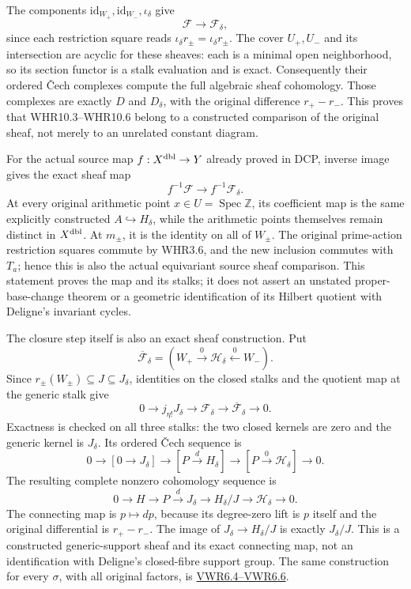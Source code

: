 The components \(\mathrm{id}_{W_+},\mathrm{id}_{W_-},\iota_\delta\) give
\[
\mathcal F\longrightarrow\mathcal F_\delta,
\tag{WHR10.8}
\] since each restriction square reads
\(\iota_\delta r_\pm=\iota_\delta r_\pm\). The cover \(U_+,U_-\) and its
intersection are acyclic for these sheaves: each is a minimal open
neighborhood, so its section functor is a stalk evaluation and is exact.
Consequently their ordered Čech complexes compute the full algebraic
sheaf cohomology. Those complexes are exactly \(D\) and \(D_\delta\),
with the original difference \(r_+-r_-\). This proves that
WHR10.3--WHR10.6 belong to a constructed comparison of the original
sheaf, not merely to an unrelated constant diagram.

For the actual source map \(f:X^{\rm dbl}\to Y\) already proved in DCP,
inverse image gives the exact sheaf map \[
f^{-1}\mathcal F\longrightarrow f^{-1}\mathcal F_\delta.
\tag{WHR10.9}
\] At every original arithmetic point
\(x\in U=\operatorname{Spec}\mathbb Z\), its coefficient map is the same
explicitly constructed \(A\hookrightarrow H_\delta\), while the
arithmetic points themselves remain distinct in \(X^{\rm dbl}\). At
\(m_\pm\), it is the identity on all of \(W_\pm\). The original
prime-action restriction squares commute by WHR3.6, and the new
inclusion commutes with \(T_a\); hence this is also the actual
equivariant source sheaf comparison. This statement proves the map and
its stalks; it does not assert an unstated proper-base-change theorem or
a geometric identification of its Hilbert quotient with Deligne's
invariant cycles.

The closure step itself is also an exact sheaf construction. Put \[
\overline{\mathcal F}_\delta
=(W_+\xrightarrow0\mathcal H_\delta\xleftarrow0W_-).
\] Since \(r_\pm(W_\pm)\subseteq J\subseteq J_\delta\), identities on
the closed stalks and the quotient map at the generic stalk give \[
0\longrightarrow j_{\eta!}J_\delta
\longrightarrow\mathcal F_\delta
\longrightarrow\overline{\mathcal F}_\delta
\longrightarrow0.
\tag{WHR10.10}
\] Exactness is checked on all three stalks: the two closed kernels are
zero and the generic kernel is \(J_\delta\). Its ordered Čech sequence
is \[
0\longrightarrow[0\longrightarrow J_\delta]
\longrightarrow[P\xrightarrow d H_\delta]
\longrightarrow[P\xrightarrow0\mathcal H_\delta]
\longrightarrow0.
\] The resulting complete nonzero cohomology sequence is \[
0\longrightarrow H\longrightarrow P\xrightarrow d J_\delta
\longrightarrow H_\delta/J
\longrightarrow\mathcal H_\delta\longrightarrow0.
\tag{WHR10.11}
\] The connecting map is \(p\mapsto dp\), because its degree-zero lift
is \(p\) itself and the original differential is \(r_+-r_-\). The image
of \(J_\delta\to H_\delta/J\) is exactly \(J_\delta/J\). This is a
constructed generic-support sheaf and its exact connecting map, not an
identification with Deligne's closed-fibre support group. The same
construction for every \(\sigma\), with all original factors, is
\href{https://github.com/KokunoYumeto/zeta-function-research-reader/blob/main/workbenches/splitzero-tandem/continuations/20260925-full-source-tensor-and-original-divisor/counterfactual/FULL_VERTICAL_WEIGHT_RETURN.md}{VWR6.4--VWR6.6}.

